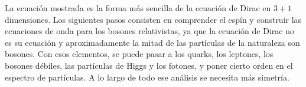 \begin{classroomqa}
\end{classroomqa}

La ecuación mostrada es la forma más sencilla de la ecuación de Dirac en \(3+1\) dimensiones. Los siguientes pasos consisten en comprender el espín y construir las ecuaciones de onda para los bosones relativistas, ya que la ecuación de Dirac no es su ecuación y aproximadamente la mitad de las partículas de la naturaleza son bosones. Con esos elementos, se puede pasar a los quarks, los leptones, los bosones débiles, las partículas de Higgs y los fotones, y poner cierto orden en el espectro de partículas. A lo largo de todo ese análisis se necesita más simetría.
